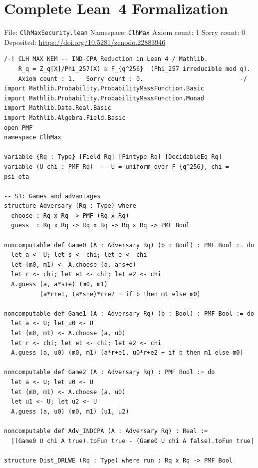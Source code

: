 \documentclass[11pt,a4paper]{article}
\theoremstyle{remark}
\begin{document}
\appendix
\section{Complete Lean~4 Formalization}
\label{app:lean}

File: \texttt{ClhMaxSecurity.lean} \quad
Namespace: \texttt{ClhMax} \quad
Axiom count: 1 \quad Sorry count: 0\\
Deposited: \url{https://doi.org/10.5281/zenodo.22883946}

\begin{lstlisting}[language={}]
/-! CLH MAX KEM -- IND-CPA Reduction in Lean 4 / Mathlib.
    R_q = Z_q[X]/Phi_257(X) ≅ F_{q^256}  (Phi_257 irreducible mod q).
    Axiom count : 1.   Sorry count : 0.                           -/
import Mathlib.Probability.ProbabilityMassFunction.Basic
import Mathlib.Probability.ProbabilityMassFunction.Monad
import Mathlib.Data.Real.Basic
import Mathlib.Algebra.Field.Basic
open PMF
namespace ClhMax

variable {Rq : Type} [Field Rq] [Fintype Rq] [DecidableEq Rq]
variable (U chi : PMF Rq)  -- U = uniform over F_{q^256}, chi = psi_eta

-- S1: Games and advantages
structure Adversary (Rq : Type) where
  choose : Rq x Rq -> PMF (Rq x Rq)
  guess  : Rq x Rq -> Rq x Rq -> Rq x Rq -> PMF Bool

noncomputable def Game0 (A : Adversary Rq) (b : Bool) : PMF Bool := do
  let a <- U; let s <- chi; let e <- chi
  let (m0, m1) <- A.choose (a, a*s+e)
  let r <- chi; let e1 <- chi; let e2 <- chi
  A.guess (a, a*s+e) (m0, m1)
          (a*r+e1, (a*s+e)*r+e2 + if b then m1 else m0)

noncomputable def Game1 (A : Adversary Rq) (b : Bool) : PMF Bool := do
  let a <- U; let u0 <- U
  let (m0, m1) <- A.choose (a, u0)
  let r <- chi; let e1 <- chi; let e2 <- chi
  A.guess (a, u0) (m0, m1) (a*r+e1, u0*r+e2 + if b then m1 else m0)

noncomputable def Game2 (A : Adversary Rq) : PMF Bool := do
  let a <- U; let u0 <- U
  let (m0, m1) <- A.choose (a, u0)
  let u1 <- U; let u2 <- U
  A.guess (a, u0) (m0, m1) (u1, u2)

noncomputable def Adv_INDCPA (A : Adversary Rq) : Real :=
  |(Game0 U chi A true).toFun true - (Game0 U chi A false).toFun true|

structure Dist_DRLWE (Rq : Type) where run : Rq x Rq -> PMF Bool


\end{lstlisting}
\end{document}

